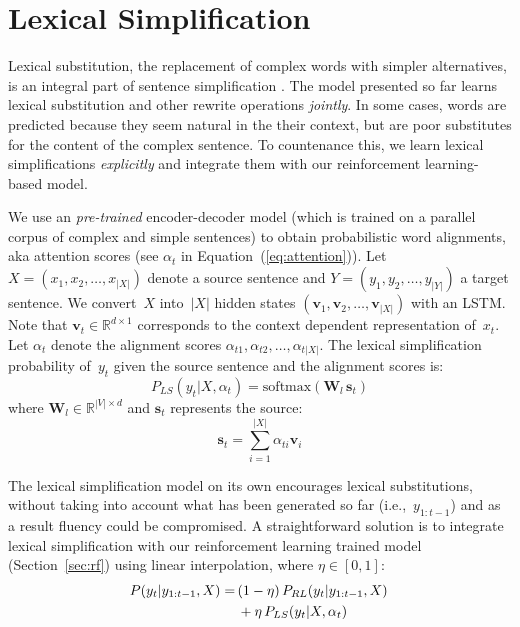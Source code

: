 \documentclass[11pt,letterpaper]{article}
\begin{document}
\section{Lexical Simplification}
\label{sec:ltm}
Lexical substitution, the replacement of complex words with simpler
alternatives, is an integral part of sentence simplification
\cite{specia-jauhar-mihalcea:2012:STARSEM-SEMEVAL}.
The model presented so far learns lexical substitution and other
rewrite operations \emph{jointly}. In some cases, words are predicted because
they seem natural in the their context, but are poor substitutes for
the content of the complex sentence. To countenance this, we learn
lexical simplifications \emph{explicitly} and integrate them with our
reinforcement learning-based model.









We use an {\it pre-trained} encoder-decoder model (which is trained on a parallel corpus of
complex and simple sentences) to obtain probabilistic word alignments,
aka attention scores (see $\alpha_t$ in
Equation~(\ref{eq:attention})).  Let $X = (x_1, x_2, \dots, x_{|X|})$
denote a source sentence and $Y = (y_1, y_2, \dots, y_{|Y|})$ a target
sentence. We convert~$X$ into~$|X|$ hidden states
$(\mathbf{v}_1,\mathbf{v}_2, \dots, \mathbf{v}_{|X|})$ with an
LSTM. Note that \mbox{$\mathbf{v}_t \in \mathbb{R}^{d \times 1}$}
corresponds to the context dependent representation of~$x_t$. Let
$\alpha_t$ denote the alignment scores
$\alpha_{t1}, \alpha_{t2}, \dots, \alpha_{t|X|}$. The lexical
simplification probability of~$y_t$ given the source sentence and the
alignment scores is:
\begin{equation}
P_{LS}(y_t | X, \alpha_t) = \text{softmax}(\mathbf{W}_l \, \mathbf{s}_t) 
\end{equation}
where $\mathbf{W}_l \in \mathbb{R}^{|V| \times d}$ and $\mathbf{s}_t$
represents the source:
\begin{equation}
\mathbf{s}_t = \sum_{i=1}^{|X|} \alpha_{ti} \mathbf{v}_i
\end{equation}

The lexical simplification model on its own encourages lexical
substitutions, without taking into account what has been generated so
far (i.e.,~$y_{1:t-1}$) and as a result fluency could be
compromised. A straightforward solution is to integrate lexical
simplification with our reinforcement learning trained model
(Section~\ref{sec:rf}) using linear interpolation, where
$\eta \in [0, 1]$:
\begin{equation}
\begin{split}
\hspace*{-3ex}P(y_t|y_{1:t-1}, X) = \, & (1-\eta) \, P_{RL}(y_t|y_{1:t-1},X) \\
\hspace*{-8ex}		& + \eta \, P_{LS}(y_t|X, \alpha_t)
\end{split}\hspace*{-.4cm}
\end{equation}
\end{document}
